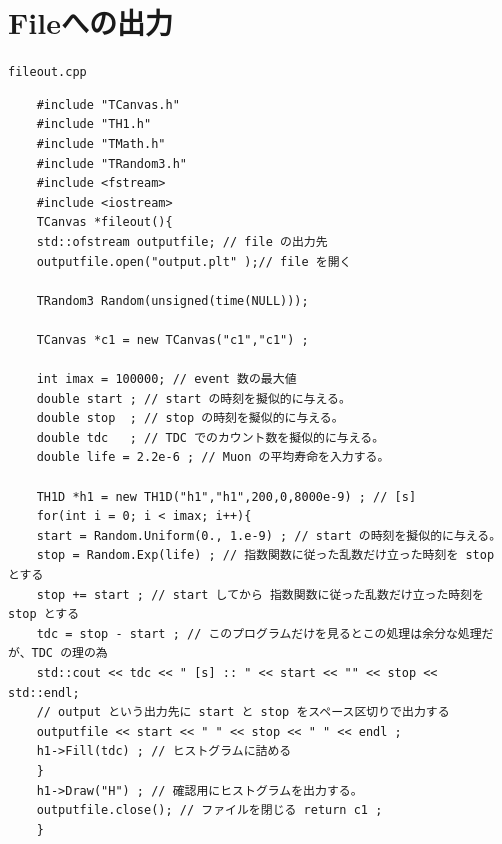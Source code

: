 \documentclass{jarticle}
\begin{document}
  \clearpage
 \section{Fileへの出力}

 \begin{itembox}{\texttt{fileout.cpp}}
\begin{verbatim}
	#include "TCanvas.h"
	#include "TH1.h"
	#include "TMath.h"
	#include "TRandom3.h"
	#include <fstream>
	#include <iostream>
	TCanvas *fileout(){
	std::ofstream outputfile; // file の出力先
	outputfile.open("output.plt" );// file を開く

	TRandom3 Random(unsigned(time(NULL)));

	TCanvas *c1 = new TCanvas("c1","c1") ;

	int imax = 100000; // event 数の最大値
	double start ; // start の時刻を擬似的に与える。 
	double stop  ; // stop の時刻を擬似的に与える。 
	double tdc   ; // TDC でのカウント数を擬似的に与える。
	double life = 2.2e-6 ; // Muon の平均寿命を入力する。

	TH1D *h1 = new TH1D("h1","h1",200,0,8000e-9) ; // [s]
	for(int i = 0; i < imax; i++){
	start = Random.Uniform(0., 1.e-9) ; // start の時刻を擬似的に与える。
	stop = Random.Exp(life) ; // 指数関数に従った乱数だけ立った時刻を stop とする
	stop += start ; // start してから 指数関数に従った乱数だけ立った時刻を stop とする
	tdc = stop - start ; // このプログラムだけを見るとこの処理は余分な処理だが、TDC の理の為
	std::cout << tdc << " [s] :: " << start << "" << stop << std::endl;
	// output という出力先に start と stop をスペース区切りで出力する
	outputfile << start << " " << stop << " " << endl ;
	h1->Fill(tdc) ; // ヒストグラムに詰める
	}
	h1->Draw("H") ; // 確認用にヒストグラムを出力する。
	outputfile.close(); // ファイルを閉じる return c1 ;
	}

\end{verbatim}
 \end{itembox}
\end{document}
